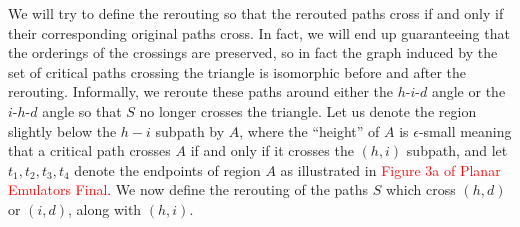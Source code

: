 \documentclass[11pt]{article}
\begin{document}
We will try to define the rerouting so that the rerouted paths cross if and only if their corresponding original paths cross. In fact, we will end up guaranteeing that the orderings of the crossings are preserved, so in fact the graph induced by the set of critical paths crossing the triangle is isomorphic before and after the rerouting. Informally, we reroute these paths around either the $h$-$i$-$d$ angle or the $i$-$h$-$d$ angle so that $S$ no longer crosses the triangle. Let us denote the region slightly below the $h-i$ subpath by $A$, where the ``height'' of $A$ is $\epsilon$-small meaning that a critical path crosses $A$ if and only if it crosses the $(h,i)$ subpath, and let $t_1,t_2,t_3,t_4$ denote the endpoints of region $A$ as illustrated in \textcolor{red}{Figure 3a of Planar Emulators Final}. We now define the rerouting of the paths $S$ which cross $(h,d)$ or $(i,d)$, along with $(h,i)$. 
\end{document}
